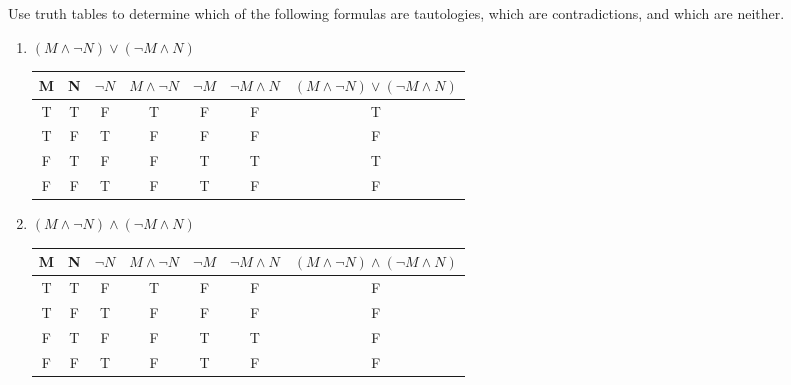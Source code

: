 \begin{prob}
Use truth tables to determine which of the following formulas are tautologies, which are contradictions, and which are neither.
\begin{enumerate}
\item $ (M \wedge \neg N) \vee ( \neg M \wedge N) $\\
\begin{center}
\begin{tabular}{|c|c|c|c|c|c|c|} 
\hline
M & N & $ \neg N $ & $ M \wedge \neg N $ & $ \neg M $ & $ \neg M \wedge N $ & $ (M \wedge \neg N) \vee ( \neg M \wedge N) $ \\
\hline
T & T & F          & T                   & F          & F                   & T                                             \\
T & F & T          & F                   & F          & F                   & F                                             \\
F & T & F          & F                   & T          & T                   & T                                             \\
F & F & T          & F                   & T          & F                   & F                                              \\
\hline
\end{tabular}
\end{center}
\item $ (M \wedge \neg N) \wedge ( \neg M \wedge N) $ \\
\begin{center}
\begin{tabular}{|c|c|c|c|c|c|c|} 
\hline
M & N & $ \neg N $ & $ M \wedge \neg N $ & $ \neg M $ & $ \neg M \wedge N $ & $ (M \wedge \neg N) \wedge ( \neg M \wedge N) $ \\
\hline
T & T & F          & T                   & F          & F                   & F                                               \\
T & F & T          & F                   & F          & F                   & F                                               \\
F & T & F          & F                   & T          & T                   & F                                               \\
F & F & T          & F                   & T          & F                   & F                                               \\
\hline
\end{tabular}

\end{center}
\end{enumerate}
\end{prob}
